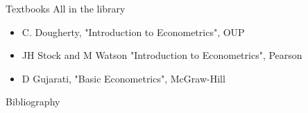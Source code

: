 \documentclass[14pt,xcolor=pdftex,dvipsnames,table]{beamer}\usepackage[]{graphicx}\usepackage[]{color}
\begin{document}
\begin{frame}{Textbooks}
All in the library
\pause
\begin{itemize}[<+-| alert@+>]
\item C. Dougherty, "Introduction to Econometrics", OUP
\item JH Stock and M Watson "Introduction to Econometrics",  Pearson
\item D Gujarati, "Basic Econometrics", McGraw-Hill
\end{itemize}  
\end{frame}



\begin{frame}{Bibliography}

\end{frame}
\end{document}
